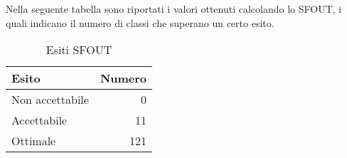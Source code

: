 \newpage
Nella seguente tabella sono riportati i valori ottenuti calcolando lo SFOUT, i quali indicano il numero di classi che superano un certo esito.
\begin{table}[h]

\centering
\begin{tabular}{l r}
	\hline
	\rule[-0.3cm]{0cm}{0.8cm}
	\textbf{Esito} & \textbf{Numero} \\
	\hline
	\rule[0cm]{0cm}{0.4cm}
	Non accettabile & 0 \\
	\rule[0cm]{0cm}{0.4cm}
	Accettabile & 11 \\
	\rule[0cm]{0cm}{0.4cm}
	Ottimale & 121 \\
	\hline
\end{tabular}
\caption{Esiti SFOUT}
\end{table}